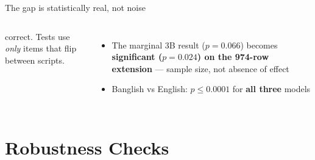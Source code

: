 \documentclass[aspectratio=169,10pt]{beamer}
\begin{document}
\begin{frame}{The gap is statistically real, not noise}
\begin{columns}[T]
{       correct. Tests use \emph{only} items that flip between scripts.\par}
      \vspace{5pt}
      {\fontsize{8.7}{12}\selectfont
      \begin{itemize}
        \item The marginal 3B result ($p{=}0.066$) becomes \textbf{significant
              ($p{=}0.024$) on the 974-row extension} --- sample size, not absence of effect
        \item Banglish vs English: $p \le 0.0001$ for \textbf{all three} models
      \end{itemize}\par}
  \end{columns}
\end{frame}

\section{Robustness Checks}
\end{document}
